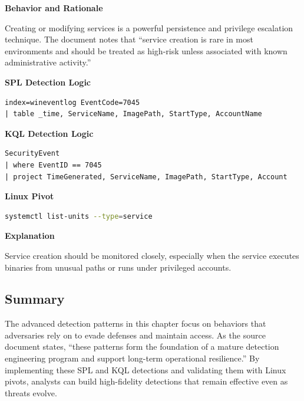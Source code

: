 \textbf{Behavior and Rationale}

Creating or modifying services is a powerful persistence and privilege escalation technique. The document notes that “service 
creation is rare in most environments and should be treated as high-risk unless associated with known administrative activity.”

\textbf{SPL Detection Logic}

\begin{lstlisting}
index=wineventlog EventCode=7045
| table _time, ServiceName, ImagePath, StartType, AccountName
\end{lstlisting}

\textbf{KQL Detection Logic}

\begin{lstlisting}
SecurityEvent
| where EventID == 7045
| project TimeGenerated, ServiceName, ImagePath, StartType, Account
\end{lstlisting}

\textbf{Linux Pivot}

\begin{lstlisting}[language=bash]
systemctl list-units --type=service
\end{lstlisting}

\textbf{Explanation}

Service creation should be monitored closely, especially when the service executes binaries from unusual paths or runs under 
privileged accounts.


\subsection*{Summary}

The advanced detection patterns in this chapter focus on behaviors that adversaries rely on to evade defenses and maintain access. 
As the source document states, “these patterns form the foundation of a mature detection engineering program and support long-term 
operational resilience.” By implementing these SPL and KQL detections and validating them with Linux pivots, analysts can build 
high-fidelity detections that remain effective even as threats evolve.
